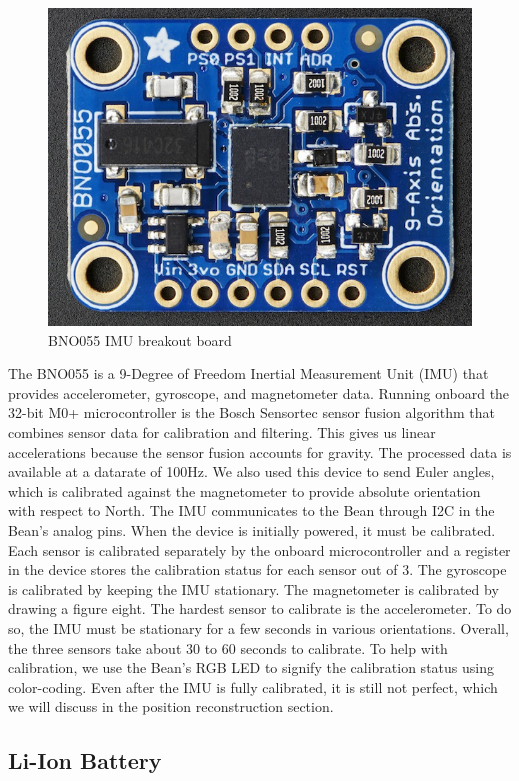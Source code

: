 \documentclass[12pt,journal]{IEEEtran}
\begin{document}
\begin{figure}[H]
    \includegraphics[width=0.6\linewidth]{figures/imu}
  \caption{BNO055 IMU breakout board}
  \label{fig:imu}
\end{figure}
  The BNO055 is a 9-Degree of Freedom Inertial Measurement Unit (IMU) that provides accelerometer, gyroscope, and magnetometer data. Running onboard the 32-bit M0+ microcontroller is the Bosch Sensortec sensor fusion algorithm that combines sensor data for calibration and filtering. This gives us linear accelerations because the sensor fusion accounts for gravity. The processed data is available at a datarate of 100Hz. We also used this device to send Euler angles, which is calibrated against the magnetometer to provide absolute orientation with respect to North. The IMU communicates to the Bean through I2C in the Bean’s analog pins.
  When the device is initially powered, it must be calibrated. Each sensor is calibrated separately by the onboard microcontroller and a register in the device stores the calibration status for each sensor out of 3. The gyroscope is calibrated by keeping the IMU stationary. The magnetometer is calibrated by drawing a figure eight. The hardest sensor to calibrate is the accelerometer. To do so, the IMU must be stationary for a few seconds in various orientations. Overall, the three sensors take about 30 to 60 seconds to calibrate. To help with calibration, we use the Bean’s RGB LED to signify the calibration status using color-coding. Even after the IMU is fully calibrated, it is still not perfect, which we will discuss in the position reconstruction section.
\subsection{Li-Ion Battery}
\end{document}
